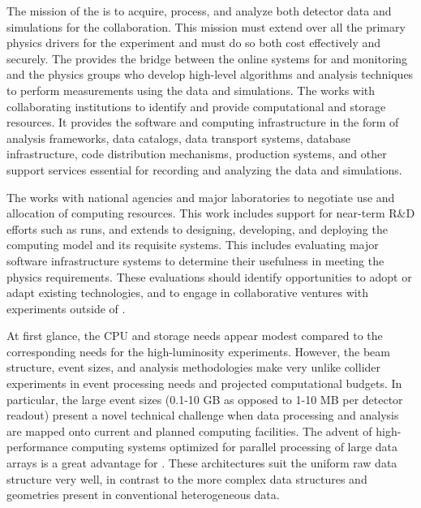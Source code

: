 The mission of the  %
 is to acquire, process, and analyze both detector data and  simulations for the %
collaboration.  This mission must extend over all the primary physics drivers for the experiment and must do so both cost effectively and securely. The  provides the bridge between the online systems for  and monitoring and the physics groups who develop high-level algorithms and analysis techniques to perform measurements using the   data and simulations. The  works with collaborating institutions to identify and provide computational and storage resources.  %
It provides the software and computing infrastructure in the form of analysis frameworks, data catalogs, data transport systems, database infrastructure, code distribution mechanisms, production systems, and other support services essential for recording and analyzing the data and simulations. 

The  works with national agencies and major laboratories to negotiate use and allocation of computing resources.  This work includes support for near-term R\&D efforts %
such as  runs, and extends to designing, developing, and deploying the  computing model and its requisite systems. 
This includes evaluating major software infrastructure systems to determine their usefulness %
in meeting the  physics requirements.  These evaluations should identify opportunities to adopt or adapt existing technologies, and to engage in collaborative ventures with  experiments outside of . 

At first glance,  the  CPU and storage needs %
appear modest %
compared to the corresponding needs for the high-luminosity  experiments.  
However, the  beam structure, event sizes, and analysis methodologies make  very unlike collider experiments %
in event processing needs and projected computational budgets. 
In particular, the large  event sizes (0.1-10 GB as opposed to 1-10 MB per detector readout) present a novel technical challenge when data processing and analysis are mapped onto  current and planned computing facilities. 
The advent of high-performance computing systems optimized for parallel processing of large data arrays is a great advantage for . These architectures suit the uniform  raw data structure very well, in contrast to the more complex data structures and geometries present in conventional %
heterogeneous  data. 


